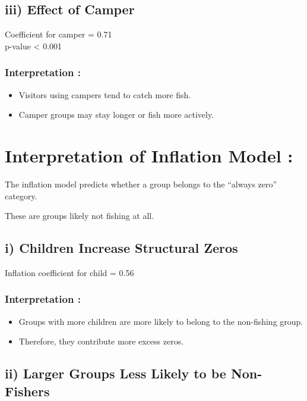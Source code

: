 \documentclass[
]{article}
\begin{document}
\subsection{iii) Effect of Camper}\label{iii-effect-of-camper}

Coefficient for camper = 0.71\\
p-value \textless{} 0.001

\subsubsection{Interpretation :}\label{interpretation-20}

\begin{itemize}
\item
  Visitors using campers tend to catch more fish.
\item
  Camper groups may stay longer or fish more actively.
\end{itemize}

\section{\texorpdfstring{\textbf{Interpretation of Inflation Model
:}}{Interpretation of Inflation Model :}}\label{interpretation-of-inflation-model}

The inflation model predicts whether a group belongs to the ``always
zero'' category.

These are groups likely not fishing at all.

\subsection{i) Children Increase Structural
Zeros}\label{i-children-increase-structural-zeros}

Inflation coefficient for child = 0.56

\subsubsection{Interpretation :}\label{interpretation-21}

\begin{itemize}
\item
  Groups with more children are more likely to belong to the non-fishing
  group.
\item
  Therefore, they contribute more excess zeros.
\end{itemize}

\subsection{ii) Larger Groups Less Likely to be
Non-Fishers}\label{ii-larger-groups-less-likely-to-be-non-fishers}
\end{document}
